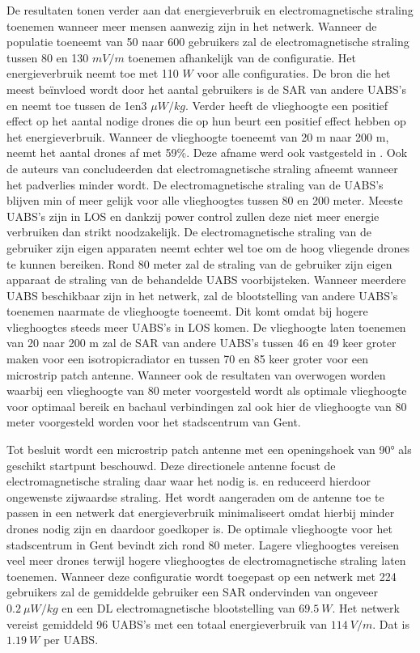 \documentclass[twocolumn]{phdsymp_dutch}
\begin{document}
De resultaten tonen verder aan dat energieverbruik en electromagnetische straling toenemen wanneer 
meer mensen aanwezig zijn in het netwerk. Wanneer de populatie toeneemt van 50 naar 600 gebruikers 
zal de electromagnetische straling tussen 80 en 130 $mV/m$ toenemen afhankelijk van de configuratie.
Het energieverbruik neemt toe met 110 $W$ voor alle configuraties.
De bron die het meest be\"invloed wordt  door het aantal gebruikers is de \gls{SAR} van andere \gls{UABS}'s 
en neemt toe tussen de 1en3 $\mu W/kg$. 
Verder heeft de vlieghoogte een positief effect op het aantal nodige drones die op hun beurt een positief 
effect hebben op het energieverbruik. Wanneer de vlieghoogte toeneemt van 20 m naar 200 m, neemt het aantal 
drones af met 59\%. Deze afname werd ook vastgesteld in \cite{J2}.
Ook de auteurs van \cite{J17_kuehn2019modelling} concludeerden dat electromagnetische straling afneemt wanneer 
het padverlies minder wordt.
De electromagnetische straling van de  \gls{UABS}'s blijven min of meer gelijk voor alle vlieghoogtes tussen 80 en 200 meter. 
Meeste \gls{UABS}'s zijn in \gls{LOS} en dankzij power control zullen deze niet meer energie verbruiken dan strikt noodzakelijk.
De electromagnetische straling van de gebruiker zijn eigen apparaten neemt echter wel toe om de hoog vliegende drones te kunnen bereiken.
Rond 80 meter zal de straling van de gebruiker zijn eigen apparaat de straling van de behandelde \gls{UABS} voorbijsteken.
Wanneer meerdere \gls{UABS} beschikbaar zijn in het netwerk, zal de blootstelling van andere \gls{UABS}'s toenemen 
naarmate de vlieghoogte toeneemt. Dit komt omdat bij hogere vlieghoogtes steeds meer \gls{UABS}'s in \gls{LOS} komen.
De vlieghoogte laten toenemen van 20 naar 200 m zal de 
 \gls{SAR} van andere \gls{UABS}'s tussen 46 en 49 keer groter maken voor een \gls{isotropicradiator} en tussen
70 en 85 keer groter voor een microstrip patch antenne.
Wanneer ook de resultaten van \cite{U1} overwogen worden waarbij een vlieghoogte van 80 meter voorgesteld wordt als optimale 
vlieghoogte  voor optimaal bereik en bachaul verbindingen zal ook hier de vlieghoogte van 80 meter voorgesteld worden 
voor het stadscentrum van Gent.

Tot besluit wordt een microstrip patch antenne
met een openingshoek van \ang{90} als geschikt startpunt beschouwd.
Deze directionele  antenne focust de electromagnetische straling daar waar het nodig is.
en reduceerd hierdoor ongewenste zijwaardse straling.
Het wordt aangeraden om de antenne toe te passen in een netwerk dat energieverbruik minimaliseert
omdat hierbij minder drones nodig zijn en daardoor goedkoper is.
De optimale vlieghoogte voor het stadscentrum in Gent bevindt zich rond 80  meter.
Lagere vlieghoogtes vereisen veel meer drones terwijl hogere vlieghoogtes de 
electromagnetische straling laten toenemen.
Wanneer deze configuratie wordt toegepast op een netwerk met 224 gebruikers zal 
de gemiddelde gebruiker een \gls{SAR} ondervinden  van ongeveer $0.2\ \mu W/kg$ en een
 \gls{DL} electromagnetische blootstelling van $69.5\ W$. 
 Het netwerk vereist gemiddeld 96 \gls{UABS}'s met een totaal energieverbruik van
 $114\ V/m$. Dat is $1.19\ W$ per \gls{UABS}.
\end{document}
